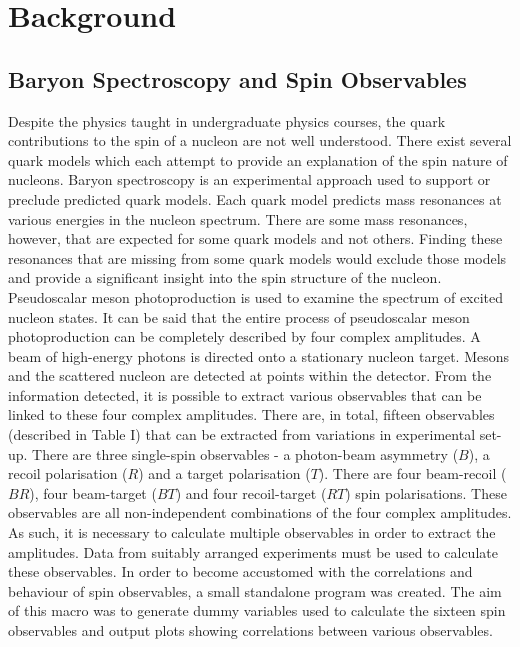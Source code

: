 \documentclass[a4paper,12pt]{article}
\begin{document}
\section{Background}
\subsection{Baryon Spectroscopy and Spin Observables} 
Despite the physics taught in undergraduate physics courses, the quark contributions to the spin of a nucleon are not well understood.  There exist several quark models which each attempt to provide an explanation of the spin nature of nucleons.  Baryon spectroscopy is an experimental approach used to support or preclude predicted quark models.  Each quark model predicts mass resonances at various energies in the nucleon spectrum.  There are some mass resonances, however, that are expected for some quark models and not others.  Finding these resonances that are missing from some quark models would exclude those models and provide a significant insight into the spin structure of the nucleon.\cite{nstar}
\newline
Pseudoscalar meson photoproduction is used to examine the spectrum of excited nucleon states.  It can be said that the entire process of pseudoscalar meson photoproduction can be completely described by four complex amplitudes.  A beam of high-energy photons is directed onto a stationary nucleon target.  Mesons and the scattered nucleon are detected at points within the detector.  From the information detected, it is possible to extract various observables that can be linked to these four complex amplitudes.  There are, in total, fifteen observables (described in Table I) that can be extracted from variations in experimental set-up.  There are three single-spin observables - a photon-beam asymmetry ($B$), a recoil polarisation ($R$) and a target polarisation ($T$).  There are four beam-recoil ($BR$), four beam-target ($BT$) and four recoil-target ($RT$) spin polarisations.  These observables are all non-independent combinations of the four complex amplitudes.  As such, it is necessary to calculate multiple observables in order to extract the amplitudes. Data from suitably arranged experiments must be used to calculate these observables. \cite{nstar, info}
\newline
In order to become accustomed with the correlations and behaviour of spin observables, a small standalone program was created.  The aim of this macro was to generate dummy variables used to calculate the sixteen spin observables and output plots showing correlations between various observables.
\end{document}
